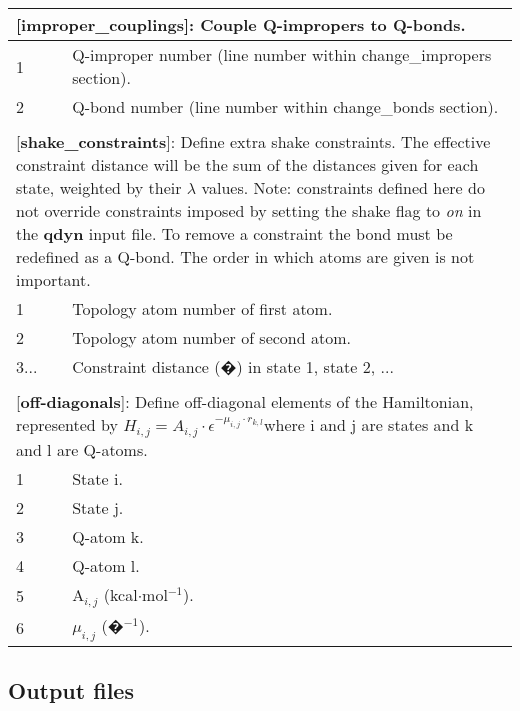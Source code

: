 \documentclass[a4paper,10pt]{article}
\begin{document}
\begin{longtable}{|p{53pt}|p{181pt}|p{160pt}|}
\multicolumn{3}{p{394pt}}{[\textbf{improper\_couplings}]: Couple Q-impropers to Q-bonds.}\\
\hline 1 & \multicolumn{2}{p{341pt}|}{Q-improper number (line number within change\_impropers section).}\\
\hline 2 & \multicolumn{2}{p{341pt}|}{Q-bond number (line number within change\_bonds section).}\\
\hline
\multicolumn{3}{p{394pt}}{}\\

\multicolumn{3}{p{394pt}}{[\textbf{shake\_constraints}]: Define extra shake constraints. The effective constraint distance will be the sum of the distances given for each state, weighted by their $\lambda$ values. Note: constraints defined here do not override constraints imposed by setting the shake flag to \emph{on} in the \textbf{qdyn} input file. To remove a constraint the bond must be redefined as a Q-bond. The order in which atoms are given is not important.}\\
\hline 1 & \multicolumn{2}{p{341pt}|}{Topology atom number of first atom.}\\
\hline 2 & \multicolumn{2}{p{341pt}|}{Topology atom number of second atom.}\\
\hline 3... & \multicolumn{2}{p{341pt}|}{Constraint distance (�) in state 1, state 2, ...}\\
\hline
\multicolumn{3}{p{394pt}}{}\\

\multicolumn{3}{p{394pt}}{[\textbf{off-diagonals}]: Define off-diagonal elements of the Hamiltonian, represented by $H_{i,j}=A_{i,j}\cdot \epsilon^{-\mu_{i,j}\cdot r_{k,l}}$where i and j are states and k and l are Q-atoms.}\\
\hline 1 & \multicolumn{2}{p{341pt}|}{State i.}\\
\hline 2 & \multicolumn{2}{p{341pt}|}{State j.}\\
\hline 3 & \multicolumn{2}{p{341pt}|}{Q-atom k.}\\
\hline 4 & \multicolumn{2}{p{341pt}|}{Q-atom l.}\\
\hline 5 & \multicolumn{2}{p{341pt}|}{A$_{i,j}$ (kcal$\cdot$mol$^{-1}$).}\\
\hline 6 & \multicolumn{2}{p{341pt}|}{$\mu_{i,j}$ (�$^{-1}$).}\\
\hline
\end{longtable}
\normalsize

\subsection{Output files}
\label{subsec:logfiles}
\end{document}
